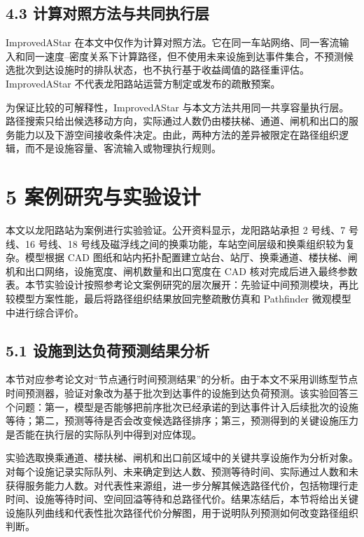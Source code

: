 \documentclass[UTF8,a4paper,12pt]{ctexart}
\begin{document}
\subsection{4.3 计算对照方法与共同执行层}

ImprovedAStar 在本文中仅作为计算对照方法。它在同一车站网络、同一客流输入和同一速度--密度关系下计算路径，但不使用未来设施到达事件集合，不预测候选批次到达设施时的排队状态，也不执行基于收益阈值的路径重评估。ImprovedAStar 不代表龙阳路站运营方制定或发布的疏散预案。

为保证比较的可解释性，ImprovedAStar 与本文方法共用同一共享容量执行层。路径搜索只给出候选移动方向，实际通过人数仍由楼扶梯、通道、闸机和出口的服务能力以及下游空间接收条件决定。由此，两种方法的差异被限定在路径组织逻辑，而不是设施容量、客流输入或物理执行规则。

\section{5 案例研究与实验设计}

本文以龙阳路站为案例进行实验验证。公开资料显示，龙阳路站承担 2 号线、7 号线、16 号线、18 号线及磁浮线之间的换乘功能，车站空间层级和换乘组织较为复杂。模型根据 CAD 图纸和站内拓扑配置建立站台、站厅、换乘通道、楼扶梯、闸机和出口网络，设施宽度、闸机数量和出口宽度在 CAD 核对完成后进入最终参数表。本节实验设计按照参考论文案例研究的层次展开：先验证中间预测模块，再比较模型方案性能，最后将路径组织结果放回完整疏散仿真和 Pathfinder 微观模型中进行综合评价。

\subsection{5.1 设施到达负荷预测结果分析}

本节对应参考论文对“节点通行时间预测结果”的分析。由于本文不采用训练型节点时间预测器，验证对象改为基于批次到达事件的设施到达负荷预测。该实验回答三个问题：第一，模型是否能够把前序批次已经承诺的到达事件计入后续批次的设施等待；第二，预测等待是否会改变候选路径排序；第三，预测得到的关键设施压力是否能在执行层的实际队列中得到对应体现。

实验选取换乘通道、楼扶梯、闸机和出口前区域中的关键共享设施作为分析对象。对每个设施记录实际队列、未来确定到达人数、预测等待时间、实际通过人数和未获得服务能力人数。对代表性来源组，进一步分解其候选路径代价，包括物理行走时间、设施等待时间、空间回溢等待和总路径代价。结果冻结后，本节将给出关键设施队列曲线和代表性批次路径代价分解图，用于说明队列预测如何改变路径组织判断。
\end{document}
